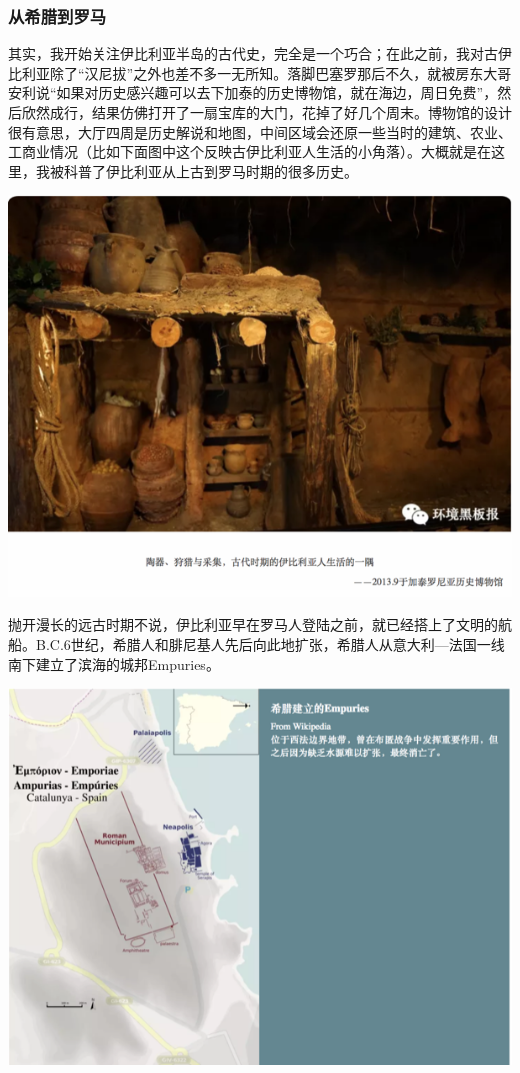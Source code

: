 \documentclass[]{book}
\begin{document}
\subsubsection{从希腊到罗马}

其实，我开始关注伊比利亚半岛的古代史，完全是一个巧合；在此之前，我对古伊比利亚除了``汉尼拔''之外也差不多一无所知。落脚巴塞罗那后不久，就被房东大哥安利说``如果对历史感兴趣可以去下加泰的历史博物馆，就在海边，周日免费''，然后欣然成行，结果仿佛打开了一扇宝库的大门，花掉了好几个周末。博物馆的设计很有意思，大厅四周是历史解说和地图，中间区域会还原一些当时的建筑、农业、工商业情况（比如下面图中这个反映古伊比利亚人生活的小角落）。大概就是在这里，我被科普了伊比利亚从上古到罗马时期的很多历史。

\includegraphics[width=8.33in]{images/xt10}

抛开漫长的远古时期不说，伊比利亚早在罗马人登陆之前，就已经搭上了文明的航船。B.C.6世纪，希腊人和腓尼基人先后向此地扩张，希腊人从意大利---法国一线南下建立了滨海的城邦Empuries。

\includegraphics[width=8.33in]{images/xt11}
\end{document}
